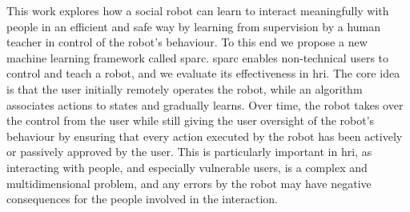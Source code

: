 This work explores how a social robot can learn to interact meaningfully with people in an efficient and safe way by learning from supervision by a human teacher in control of the robot's behaviour. To this end we propose a new machine learning framework called \gls{sparc}. \gls{sparc} enables non-technical users to control and teach a robot, and we evaluate its effectiveness in \gls{hri}. The core idea is that the user initially remotely operates the robot, while an algorithm associates actions to states and gradually learns. Over time, the robot takes over the control from the user while still giving the user oversight of the robot’s behaviour by ensuring that every action executed by the robot has been actively or passively approved by the user. This is particularly important in \gls{hri}, as interacting with people, and especially vulnerable users, is a complex and multidimensional problem, and any errors by the robot may have negative consequences for the people involved in the interaction. 

